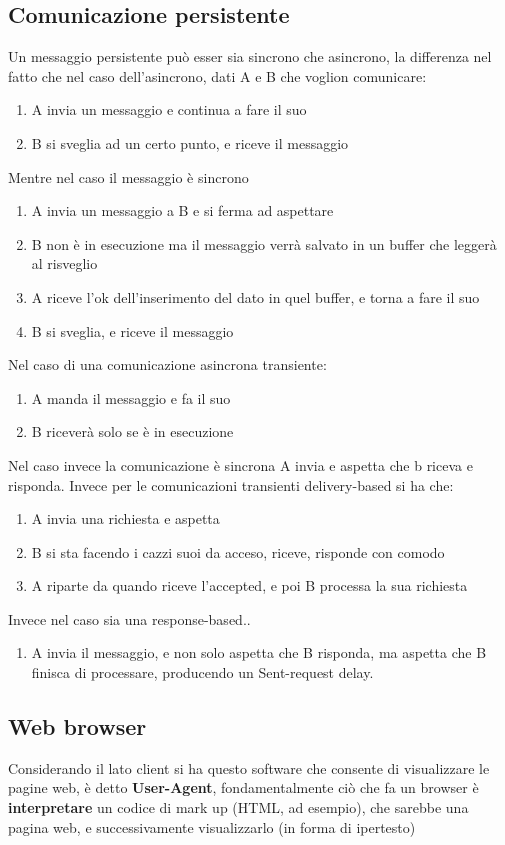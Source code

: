 \documentclass[12pt, a4paper, openany, twoside]{book}
\begin{document}
\subsection{Comunicazione persistente}
Un messaggio persistente può esser sia sincrono che asincrono, la differenza nel fatto che
nel caso dell'asincrono, dati A e B che voglion comunicare:
\begin{enumerate}
	\item A invia un messaggio e continua a fare il suo
	\item B si sveglia ad un certo punto, e riceve il messaggio
\end{enumerate}
Mentre nel caso il messaggio è sincrono
\begin{enumerate}
	\item A invia un messaggio a B e si ferma ad aspettare
	\item B non è in esecuzione ma il messaggio verrà salvato in un buffer
	che leggerà al risveglio
	\item A riceve l'ok dell'inserimento del dato in quel buffer, e torna a fare il suo
	\item B si sveglia, e riceve il messaggio
\end{enumerate}
Nel caso di una comunicazione asincrona transiente:
\begin{enumerate}
	\item A manda il messaggio e fa il suo
	\item B riceverà solo se è in esecuzione
\end{enumerate}
Nel caso invece la comunicazione è sincrona A invia e aspetta che b riceva e risponda.
Invece per le comunicazioni transienti delivery-based si ha che:
\begin{enumerate}
	\item A invia una richiesta e aspetta
	\item B si sta facendo i cazzi suoi da acceso, riceve, risponde con comodo
	\item A riparte da quando riceve l'accepted, e poi B processa la sua richiesta
\end{enumerate}
Invece nel caso sia una response-based..
\begin{enumerate}
	\item A invia il messaggio, e non solo aspetta che B risponda, ma aspetta
	che B finisca di processare, producendo un Sent-request delay.
\end{enumerate}
\subsection{Web browser}
Considerando il lato client si ha questo software che consente di visualizzare
le pagine web, è detto \textbf{User-Agent}, fondamentalmente ciò che fa un 
browser è \textbf{interpretare} un codice di mark up (HTML, ad esempio), che
sarebbe una pagina web, e successivamente visualizzarlo (in forma di ipertesto)
\end{document}
